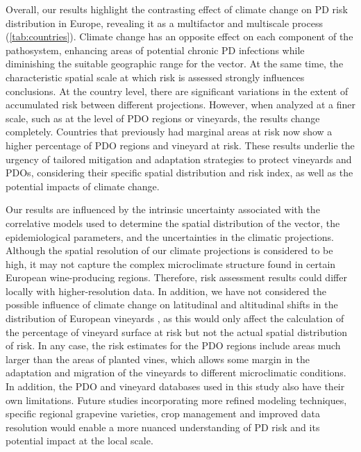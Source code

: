 Overall, our results highlight the contrasting effect of climate change on
PD risk distribution in Europe, revealing it as a multifactor and multiscale
process (\cref{tab:countries}). Climate change has an opposite effect on each
component of the pathosystem, enhancing areas of potential chronic PD
infections while diminishing the suitable geographic range for the vector. At
the same time, the characteristic spatial scale at which risk is assessed
strongly influences conclusions. At the country level, there are significant
variations in the extent of accumulated risk between different projections.
However, when analyzed at a finer scale, such as at the level of PDO regions or
vineyards, the results change completely. Countries that previously had
marginal areas at risk now show a higher percentage of PDO regions and vineyard
at risk. These results underlie the urgency of tailored mitigation and
adaptation strategies to protect vineyards and PDOs, considering their specific
spatial distribution and risk index, as well as the potential impacts of
climate change.

Our results are influenced by the intrinsic uncertainty associated with the
correlative models used to determine the spatial distribution of the vector,
the epidemiological parameters, and the uncertainties in the climatic
projections. Although the spatial resolution of our climate projections is
considered to be high, it may not capture the complex microclimate structure
found in certain European wine-producing regions. Therefore, risk assessment
results could differ locally with higher-resolution data. In addition, we have
not considered the possible influence of climate change on latitudinal and
altitudinal shifts in the distribution of European vineyards
\cite{hannah2013climate,moriondo2013projected}, as this would only affect the
calculation of the percentage of vineyard surface at risk but not the actual
spatial distribution of risk. In any case, the risk estimates for the PDO
regions include areas much larger than the areas of planted vines, which allows
some margin in the adaptation and migration of the vineyards to different
microclimatic conditions. In addition, the PDO and vineyard databases used in
this study also have their own limitations. Future studies incorporating
more refined modeling techniques, specific regional grapevine varieties, crop
management and improved data resolution would enable a more nuanced
understanding of PD risk and its potential impact at the local scale.

